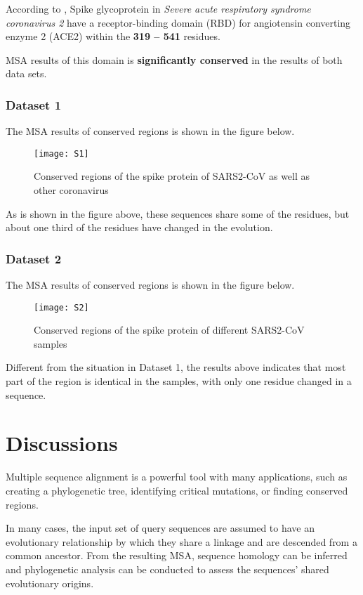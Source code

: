 According to \citet{yan2020structural}, Spike glycoprotein in \textit{Severe acute respiratory syndrome coronavirus 2} have a receptor-binding domain (RBD) for angiotensin converting enzyme 2 (ACE2) within the \textbf{319 – 541} residues.\cite{yan2020structural}

MSA results of this domain is \textbf{significantly conserved} in the results of both data sets.



\subsubsection{Dataset 1}

The MSA results of conserved regions is shown in the figure below.
\begin{figure}[H]
    \centering
    \texttt{[image: S1]}
    \caption{Conserved regions of the spike protein of SARS2-CoV as well as other coronavirus}
    \label{S-01}
\end{figure}

As is shown in the figure above, these sequences share some of the residues, but about one third of the residues have changed in the evolution.

\subsubsection{Dataset 2}

The MSA results of conserved regions is shown in the figure below.
\begin{figure}[H]
    \centering
    \texttt{[image: S2]}
    \caption{Conserved regions of the spike protein of different SARS2-CoV samples}
    \label{S-02}
\end{figure}

Different from the situation in Dataset 1, the results above indicates that most part of the region is identical in the samples, with only one residue changed in a sequence.


\section{Discussions}

Multiple sequence alignment is a powerful tool with many applications, such as creating a phylogenetic tree, identifying critical mutations, or finding conserved regions.

In many cases, the input set of query sequences are assumed to have an evolutionary relationship by which they share a linkage and are descended from a common ancestor. From the resulting MSA, sequence homology can be inferred and phylogenetic analysis can be conducted to assess the sequences' shared evolutionary origins.

